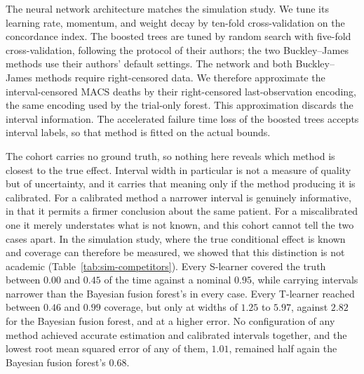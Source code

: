 The neural network architecture matches the simulation study.
We tune its learning rate, momentum, and weight decay by ten-fold cross-validation on the concordance index.
The boosted trees are tuned by random search with five-fold cross-validation, following the protocol of their authors; the two Buckley--James methods use their authors' default settings.
The network and both Buckley--James methods require right-censored data.
We therefore approximate the interval-censored MACS deaths by their right-censored last-observation encoding, the same encoding used by the trial-only forest.
This approximation discards the interval information.
The accelerated failure time loss of the boosted trees accepts interval labels, so that method is fitted on the actual bounds.

The cohort carries no ground truth, so nothing here reveals which method is closest to the true effect.
Interval width in particular is not a measure of quality but of uncertainty, and it carries that meaning only if the method producing it is calibrated.
For a calibrated method a narrower interval is genuinely informative, in that it permits a firmer conclusion about the same patient.
For a miscalibrated one it merely understates what is not known, and this cohort cannot tell the two cases apart.
In the simulation study, where the true conditional effect is known and coverage can therefore be measured, we showed that this distinction is not academic (Table~\ref{tab:sim-competitors}).
Every S-learner covered the truth between $0.00$ and $0.45$ of the time against a nominal $0.95$, while carrying intervals narrower than the Bayesian fusion forest's in every case.
Every T-learner reached between $0.46$ and $0.99$ coverage, but only at widths of $1.25$ to $5.97$, against $2.82$ for the Bayesian fusion forest, and at a higher error.
No configuration of any method achieved accurate estimation and calibrated intervals together, and the lowest root mean squared error of any of them, $1.01$, remained half again the Bayesian fusion forest's $0.68$.

